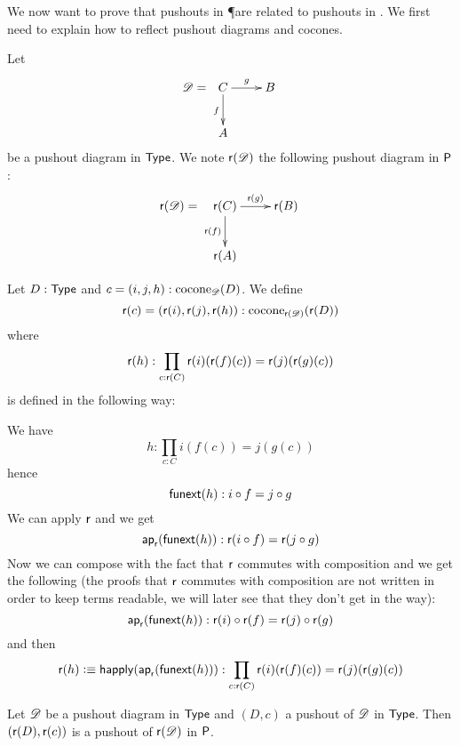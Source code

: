 
We now want to prove that pushouts in \P are related to pushouts in \type. We
first need to explain how to reflect pushout diagrams and cocones.

\begin{defn}
  Let
  \[\Ddiag=\xymatrix{C \ar^g[r] \ar_f[d] & B \\ A & }\]
  be a pushout diagram in $\type$. We note $\reflect(\Ddiag)$ the following
  pushout diagram in $\P$:
  \[\reflect(\Ddiag)=\xymatrix{\reflect(C) \ar^{\reflect(g)}[r]
    \ar_{\reflect(f)}[d] & \reflect(B) \\ \reflect(A) & }\]
\end{defn}

\begin{defn}
  Let $D:\type$ and $c=(i,j,h):\cocone{\Ddiag}{D}$.
  We define
  \[\reflect(c)=(\reflect(i),\reflect(j),\reflect(h)):
  \cocone{\reflect(\Ddiag)}{\reflect(D)}\]
  where
  \[\reflect(h):\prod_{c:\reflect(C)}\reflect(i)(\reflect(f)(c))=\reflect(j)(\reflect(g)(c))\]
  is defined in the following way:

  We have \[h:\prod_{c:C}i(f(c))=j(g(c))\]
  hence
  \[\funext(h):i\circ{}f=j\circ{}g\]
  We can apply $\reflect$ and we get
  \[\mapfunc{\reflect}(\funext(h)):\reflect(i\circ{}f)=\reflect(j\circ{}g)\]
  Now we can compose with the fact that $\reflect$ commutes with composition and
  we get the following (the proofs that $\reflect$ commutes with composition are
  not written in order to keep terms readable, we will later see that they don’t
  get in the way):
  \[\mapfunc{\reflect}(\funext(h)):
  \reflect(i)\circ\reflect(f)=\reflect(j)\circ\reflect(g)\]
  and then
  \[\reflect(h)\defeq\happly(\mapfunc{\reflect}(\funext(h))):
  \prod_{c:\reflect(C)}\reflect(i)(\reflect(f)(c))=\reflect(j)(\reflect(g)(c))\]
\end{defn}

\begin{lem}
  \label{reflectcommutespushout}
  Let $\Ddiag$ be a pushout diagram in $\type$ and $(D,c)$ a pushout of $\Ddiag$
  in $\type$. Then $(\reflect(D),\reflect(c))$ is a pushout of
  $\reflect(\Ddiag)$ in $\P$.
\end{lem}

